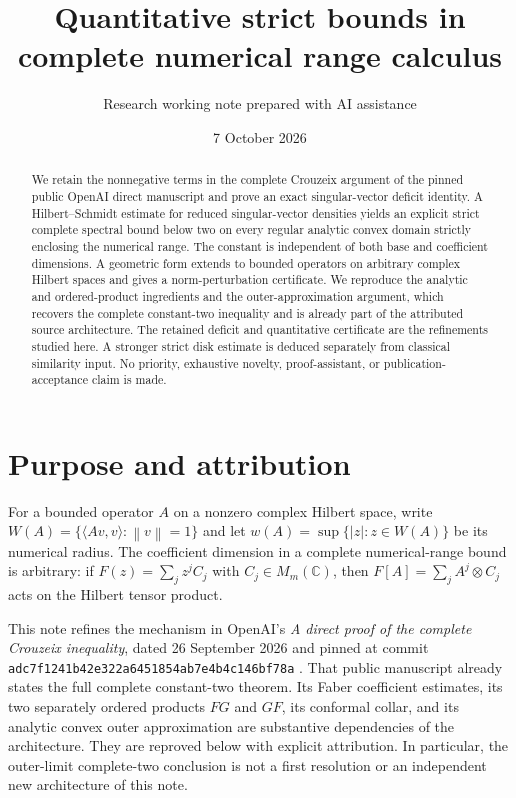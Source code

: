 \documentclass[11pt]{article}
\title{Quantitative strict bounds in complete numerical range calculus}
\author{Research working note prepared with AI assistance}
\date{7 October 2026}
\theoremstyle{remark}\newtheorem{remark}[theorem]{Remark}
\newcommand{\C}{\mathbb C}
\newcommand{\norm}[1]{\left\lVert #1\right\rVert}
\begin{document}
\maketitle
\begin{abstract}
We retain the nonnegative terms in the complete Crouzeix argument of the pinned public OpenAI direct manuscript and prove an exact singular-vector deficit identity. A Hilbert--Schmidt estimate for reduced singular-vector densities yields an explicit strict complete spectral bound below two on every regular analytic convex domain strictly enclosing the numerical range. The constant is independent of both base and coefficient dimensions. A geometric form extends to bounded operators on arbitrary complex Hilbert spaces and gives a norm-perturbation certificate. We reproduce the analytic and ordered-product ingredients and the outer-approximation argument, which recovers the complete constant-two inequality and is already part of the attributed source architecture. The retained deficit and quantitative certificate are the refinements studied here. A stronger strict disk estimate is deduced separately from classical similarity input. No priority, exhaustive novelty, proof-assistant, or publication-acceptance claim is made.
\end{abstract}
\tableofcontents


\section{Purpose and attribution}
For a bounded operator $A$ on a nonzero complex Hilbert space, write
$W(A)=\{\langle Av,v\rangle:\norm v=1\}$ and let
$w(A)=\sup\{|z|:z\in W(A)\}$ be its numerical radius.
The coefficient dimension in a complete numerical-range bound is arbitrary:
if $F(z)=\sum_j z^j C_j$ with $C_j\in M_m(\C)$, then
$F[A]=\sum_j A^j\otimes C_j$ acts on the Hilbert tensor product.

This note refines the mechanism in OpenAI's \emph{A direct proof of the complete Crouzeix inequality}, dated 26 September 2026 and pinned at commit
\texttt{adc7f1241b42e322a6451854ab7e4b4c146bf78a} \cite{OAI}.
That public manuscript already states the full complete constant-two theorem.
Its Faber coefficient estimates, its two separately ordered products $FG$ and $GF$, its conformal collar, and its analytic convex outer approximation are substantive dependencies of the architecture. They are reproved below with explicit attribution. In particular, the outer-limit complete-two conclusion is not a first resolution or an independent new architecture of this note.
\end{document}
